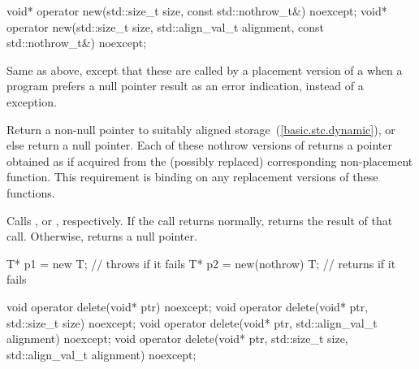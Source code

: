 %
\begin{itemdecl}
void* operator new(std::size_t size, const std::nothrow_t&) noexcept;
void* operator new(std::size_t size, std::align_val_t alignment, const std::nothrow_t&) noexcept;
\end{itemdecl}

\begin{itemdescr}
\pnum
\effects
Same as above, except that these are called by a placement version of a
when a \Cpp program prefers a null pointer result as an error indication,
instead of a
exception.

\pnum
\replaceable
{}

\pnum
\required
Return a non-null pointer to suitably aligned storage~(\ref{basic.stc.dynamic}),
or else return a null pointer.
Each of these nothrow versions of
returns a pointer obtained as if
acquired from the (possibly replaced)
corresponding non-placement function.
This requirement is binding on any replacement versions of these functions.

\pnum
{}
Calls ,
or ,
respectively.
If the call returns normally,
returns the result of that call.
Otherwise, returns a null pointer.

\pnum
\begin{example}
\begin{codeblock}
T* p1 = new T;                  // throws  if it fails
T* p2 = new(nothrow) T;         // returns  if it fails
\end{codeblock}
\end{example}
\end{itemdescr}

%
\begin{itemdecl}
void operator delete(void* ptr) noexcept;
void operator delete(void* ptr, std::size_t size) noexcept;
void operator delete(void* ptr, std::align_val_t alignment) noexcept;
void operator delete(void* ptr, std::size_t size, std::align_val_t alignment) noexcept;
\end{itemdecl}

